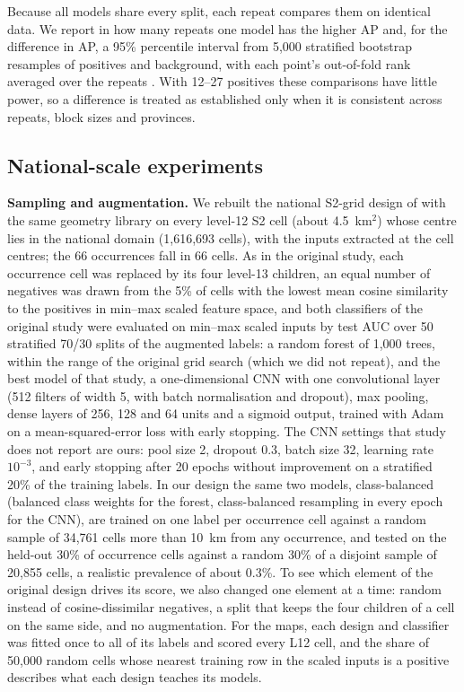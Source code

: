 \documentclass[pdflatex,sn-apa]{sn-jnl}
\begin{document}
Because all models share every split, each repeat compares them on identical data. We report in how many repeats one model has the higher AP and, for the difference in AP, a 95\% percentile interval from 5,000 stratified bootstrap resamples of positives and background, with each point's out-of-fold rank averaged over the repeats \citep{Efron1993}. With 12--27 positives these comparisons have little power, so a difference is treated as established only when it is consistent across repeats, block sizes and provinces.

\subsection{National-scale experiments}\label{sec:national-methods}

\textbf{Sampling and augmentation.} We rebuilt the national S2-grid design of \citet{Parsa2024} with the same geometry library on every level-12 S2 cell (about 4.5~km$^2$) whose centre lies in the national domain (1,616,693 cells), with the inputs extracted at the cell centres; the 66 occurrences fall in 66 cells. As in the original study, each occurrence cell was replaced by its four level-13 children, an equal number of negatives was drawn from the 5\% of cells with the lowest mean cosine similarity to the positives in min--max scaled feature space, and both classifiers of the original study were evaluated on min--max scaled inputs by test AUC over 50 stratified 70/30 splits of the augmented labels: a random forest of 1,000 trees, within the range of the original grid search (which we did not repeat), and the best model of that study, a one-dimensional CNN with one convolutional layer (512 filters of width 5, with batch normalisation and dropout), max pooling, dense layers of 256, 128 and 64 units and a sigmoid output, trained with Adam on a mean-squared-error loss with early stopping. The CNN settings that study does not report are ours: pool size 2, dropout 0.3, batch size 32, learning rate $10^{-3}$, and early stopping after 20 epochs without improvement on a stratified 20\% of the training labels. In our design the same two models, class-balanced (balanced class weights for the forest, class-balanced resampling in every epoch for the CNN), are trained on one label per occurrence cell against a random sample of 34,761 cells more than 10~km from any occurrence, and tested on the held-out 30\% of occurrence cells against a random 30\% of a disjoint sample of 20,855 cells, a realistic prevalence of about 0.3\%. To see which element of the original design drives its score, we also changed one element at a time: random instead of cosine-dissimilar negatives, a split that keeps the four children of a cell on the same side, and no augmentation. For the maps, each design and classifier was fitted once to all of its labels and scored every L12 cell, and the share of 50,000 random cells whose nearest training row in the scaled inputs is a positive describes what each design teaches its models.
\end{document}
